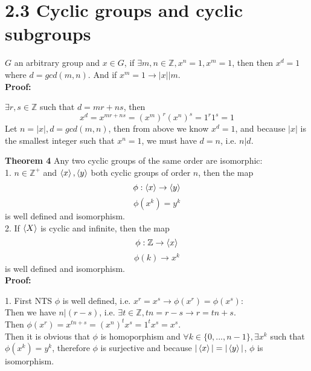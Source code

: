 \documentclass{article}
\begin{document}
\section{2.3 Cyclic groups and cyclic subgroups}
$G$ an arbitrary group and $x \in G$, if $\exists m, n \in \mathbb{Z}, x^n = 1, x^m = 1$, then then $x^d = 1$ where $d = gcd(m,n)$. And if $x^m = 1 \rightarrow |x| \vert m$.\\
\textbf{Proof:}
\begin{addmargin}[1em]{0em}
$\exists r, s \in \mathbb{Z}$ such that $d = mr + ns$, then
\begin{equation*}
    x^d = x^{mr+ns} = (x^m)^r(x^n)^s = 1^r1^s = 1
\end{equation*}
Let $n = |x|, d = gcd(m, n)$, then from above we know $x^d = 1$, and because $|x|$ is the smallest integer such that $x^n = 1$, we must have $d = n$, i.e. $n \vert d$.
\end{addmargin}
\textbf{Theorem 4} Any two cyclic groups of the same order are isomorphic:\\
1. $n \in \mathbb{Z}^+$ and $\braket{x}, \braket{y}$ both cyclic groups of order $n$, then the map
\begin{equation*}
    \phi: \braket{x} \rightarrow \braket{y}
\end{equation*}
\begin{equation*}
    \phi(x^k) = y^k
\end{equation*}
is well defined and isomorphism.\\
2. If $\braket{X}$ is cyclic and infinite, then the map
\begin{equation*}
    \phi: \mathbb{Z} \rightarrow \braket{x}
\end{equation*}
\begin{equation*}
    \phi(k) \rightarrow x^k
\end{equation*}
is well defined and isomorphism.\\
\textbf{Proof:}
\begin{addmargin}[1em]{0em}
1. First NTS $\phi$ is well defined, i.e. $x^r = x^s \rightarrow \phi(x^r) = \phi(x^s)$:\\
Then we have $n | (r-s)$, i.e. $\exists t \in \mathbb{Z}, tn = r-s \rightarrow r = tn+s$.\\
Then $\phi(x^r) = x^{tn+s} = (x^n)^tx^s = 1^tx^s = x^s$.\\
Then it is obvious that $\phi$ is homoporphism and $\forall k \in \{0, ..., n-1\}, \exists x^k$ such that $\phi(x^k) = y^k$, therefore $\phi$ is surjective and because $|\braket{x}| = |\braket{y}|$, $\phi$ is isomorphism.
\end{addmargin}
\end{document}
